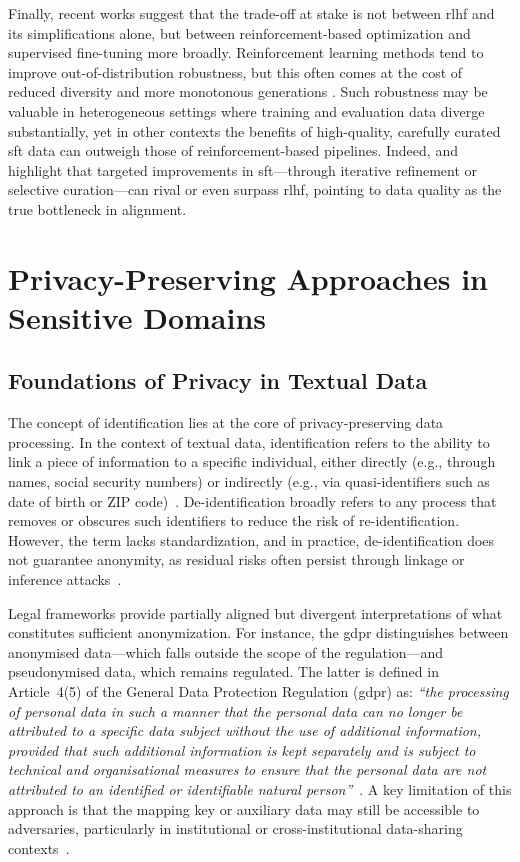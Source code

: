 Finally, recent works suggest that the trade-off at stake is not between \gls{rlhf} and its simplifications alone, but between reinforcement-based optimization and supervised fine-tuning more broadly. Reinforcement learning methods tend to improve out-of-distribution robustness, but this often comes at the cost of reduced diversity and more monotonous generations \citep{kirk2024effects}. Such robustness may be valuable in heterogeneous settings where training and evaluation data diverge substantially, yet in other contexts the benefits of high-quality, carefully curated \gls{sft} data can outweigh those of reinforcement-based pipelines. Indeed, \citet{ye2025iterativelabel} and \citet{lin2024unlockingspell} highlight that targeted improvements in \gls{sft}—through iterative refinement or selective curation—can rival or even surpass \gls{rlhf}, pointing to data quality as the true bottleneck in alignment.

\section{Privacy-Preserving Approaches in Sensitive Domains}
\subsection{Foundations of Privacy in Textual Data}
The concept of identification lies at the core of privacy-preserving data processing. In the context of textual data, identification refers to the ability to link a piece of information to a specific individual, either directly (e.g., through names, social security numbers) or indirectly (e.g., via quasi-identifiers such as date of birth or ZIP code)~\citep{sweeney2000simple}. De-identification broadly refers to any process that removes or obscures such identifiers to reduce the risk of re-identification. However, the term lacks standardization, and in practice, de-identification does not guarantee anonymity, as residual risks often persist through linkage or inference attacks~\citep{elEmam2011}.

Legal frameworks provide partially aligned but divergent interpretations of what constitutes sufficient anonymization. For instance, the \gls{gdpr} distinguishes between anonymised data---which falls outside the scope of the regulation---and pseudonymised data, which remains regulated. The latter is defined in Article~4(5) of the General Data Protection Regulation (\gls{gdpr}) as: \textit{``the processing of personal data in such a manner that the personal data can no longer be attributed to a specific data subject without the use of additional information, provided that such additional information is kept separately and is subject to technical and organisational measures to ensure that the personal data are not attributed to an identified or identifiable natural person''}~\citep{gdpr2016}. A key limitation of this approach is that the mapping key or auxiliary data may still be accessible to adversaries, particularly in institutional or cross-institutional data-sharing contexts~\citep{elEmam2011}.

